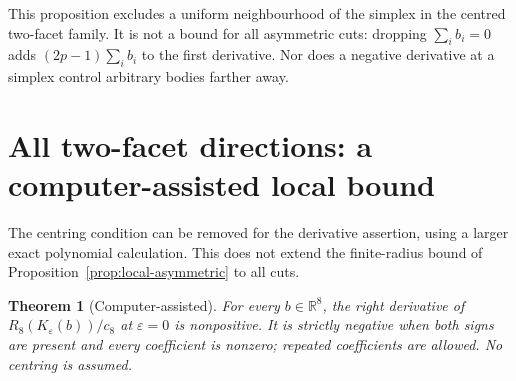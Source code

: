 \documentclass[11pt,a4paper]{article}
\newtheorem{theorem}[proposition]{Theorem}
\begin{document}
This proposition excludes a uniform neighbourhood of the simplex in
the centred two-facet family. It is not a bound for all asymmetric
cuts: dropping $\sum_i b_i=0$ adds
$(2p-1)\sum_i b_i$ to the first derivative. Nor does a negative derivative
at a simplex control arbitrary bodies farther away.

\section{All two-facet directions: a computer-assisted local bound}
The centring condition can be removed for the derivative assertion,
using a larger exact polynomial calculation. This does not extend the
finite-radius bound of Proposition~\ref{prop:local-asymmetric} to all cuts.

\begin{theorem}[Computer-assisted]\label{thm:all-cuts}
For every $b\in\mathbb R^8$, the right derivative of
$R_8(K_\varepsilon(b))/c_8$ at $\varepsilon=0$ is nonpositive.
It is strictly negative when both signs are present and every coefficient
is nonzero; repeated coefficients are allowed. No centring is assumed.
\end{theorem}
\end{document}
